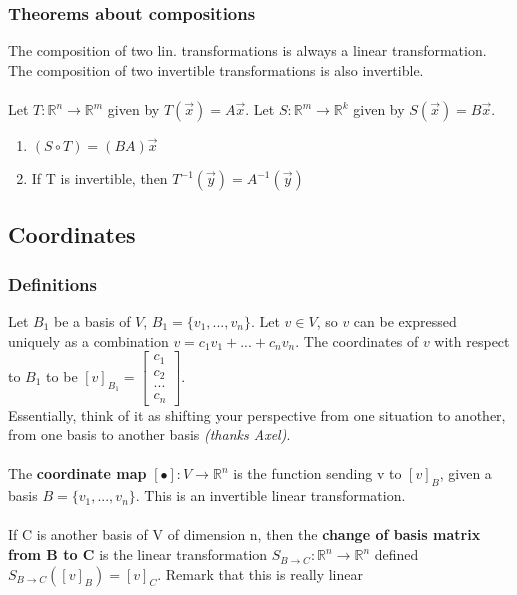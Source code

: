 \documentclass{article}
\begin{document}
\subsubsection{Theorems about compositions}
The composition of two lin. transformations is always a linear transformation.\\
The composition of two invertible transformations is also invertible.\\\\
Let $T:\mathds{R}^n\rightarrow\mathds{R}^m$ given by $T(\overrightarrow{x}) = A\overrightarrow{x}$. Let $S:\mathds{R}^m\rightarrow\mathds{R}^k$ given by $S(\overrightarrow{x}) = B\overrightarrow{x}$. 
\begin{enumerate}
    \item $(S\circ T) = (BA)\overrightarrow{x}$
    \item If T is invertible, then $T^{-1}(\overrightarrow{y}) = A^{-1}(\overrightarrow{y})$
\end{enumerate}

\subsection{Coordinates} %
\subsubsection{Definitions}
Let $B_1$ be a basis of $V$, $B_1=\{v_1,...,v_n\}$. Let $v\in V$, so $v$ can be expressed uniquely as a combination $v=c_1v_1+...+c_nv_n$. The coordinates of $v$ with respect to $B_1$ to be $[v]_{B_1} = \begin{bmatrix}
    c_1\\
    c_2\\
    ...\\
    c_n
\end{bmatrix}$.\\
Essentially, think of it as shifting your perspective from one situation to another, from one basis to another basis \textit{(thanks Axel)}.\\\\
The \textbf{coordinate map} $[\bullet]:V\rightarrow\mathds{R}^n$ is the function sending v to $[v]_B$, given a basis $B=\{v_1,...,v_n\}$. This is an invertible linear transformation.\\\\
If C is another basis of V of dimension n, then the \textbf{change of basis matrix from B to C} is the linear transformation $S_{B\rightarrow C}: \mathds{R}^n\rightarrow\mathds{R}^n$ defined $S_{B\rightarrow C}([v]_B)=[v]_C$. Remark that this is really linear
\end{document}
